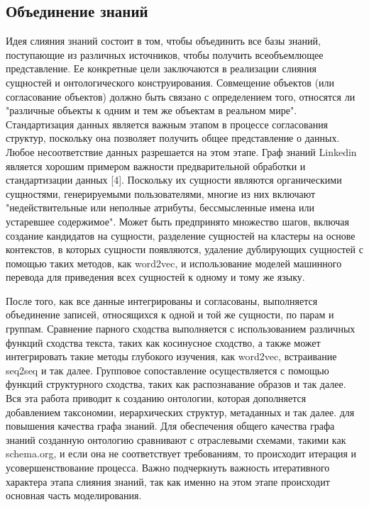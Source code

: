 \subsection{Объединение знаний}

Идея слияния знаний состоит в том, чтобы объединить все базы знаний, поступающие из различных источников, чтобы получить всеобъемлющее
представление. Ее конкретные цели заключаются в реализации слияния сущностей и онтологического конструирования. Совмещение объектов (или
согласование объектов) должно быть связано с определением того, относятся ли "различные объекты к одним и тем же объектам в реальном мире".
Стандартизация данных является важным этапом в процессе согласования структур, поскольку она позволяет получить общее представление о данных.
Любое несоответствие данных разрешается на этом этапе. Граф знаний Linkedin является хорошим примером важности предварительной обработки и
стандартизации данных [4]. Поскольку их сущности являются органическими сущностями, генерируемыми пользователями, многие из них включают
"недействительные или неполные атрибуты, бессмысленные имена или устаревшее содержимое". Может быть предпринято множество шагов, включая
создание кандидатов на сущности, разделение сущностей на кластеры на основе контекстов, в которых сущности появляются, удаление дублирующих
сущностей с помощью таких методов, как word2vec, и использование моделей машинного перевода для приведения всех сущностей к одному и тому же языку.

После того, как все данные интегрированы и согласованы, выполняется объединение записей, относящихся к одной и той же сущности, по парам и
группам. Сравнение парного сходства выполняется с использованием различных функций сходства текста, таких как косинусное сходство, а также
может интегрировать такие методы глубокого изучения, как word2vec, встраивание seq2seq и так далее. Групповое сопоставление осуществляется
с помощью функций структурного сходства, таких как распознавание образов и так далее. Вся эта работа приводит к созданию онтологии, которая
дополняется добавлением таксономии, иерархических структур, метаданных и так далее. для повышения качества графа знаний. Для обеспечения
общего качества графа знаний созданную онтологию сравнивают с отраслевыми схемами, такими как schema.org, и если она не соответствует
требованиям, то происходит итерация и усовершенствование процесса. Важно подчеркнуть важность итеративного характера этапа слияния знаний,
так как именно на этом этапе происходит основная часть моделирования.


